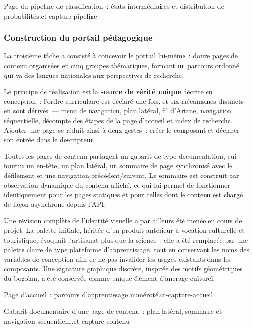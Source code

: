 {Page du pipeline de classification~: états intermédiaires et distribution de
	probabilités.}{ct-capture-pipeline}

\subsubsection{Construction du portail pédagogique}
\label{ssec:ct-portail}

La troisième tâche a consisté à concevoir le portail lui-même~: douze pages de contenu
organisées en cinq groupes thématiques, formant un parcours ordonné qui va des langues
nationales aux perspectives de recherche.

Le principe de réalisation est la \textbf{source de vérité unique} décrite en
conception~: l'ordre curriculaire est déclaré une fois, et six mécanismes distincts en
sont dérivés~--- menu de navigation, plan latéral, fil d'Ariane, navigation
séquentielle, décompte des étapes de la page d'accueil et index de recherche. Ajouter
une page se réduit ainsi à deux gestes~: créer le composant et déclarer son entrée dans
le descripteur.

Toutes les pages de contenu partagent un gabarit de type documentation, qui fournit un
en-tête, un plan latéral, un sommaire de page synchronisé avec le défilement et une
navigation \og{}précédent/suivant\fg{}. Le sommaire est construit par observation
dynamique du contenu affiché, ce qui lui permet de fonctionner identiquement pour les
pages statiques et pour celles dont le contenu est chargé de façon asynchrone depuis
l'API.

Une révision complète de l'identité visuelle a par ailleurs été menée en cours de
projet. La palette initiale, héritée d'un produit antérieur à vocation
culturelle et touristique, évoquait l'artisanat plus que la science~; elle a été
remplacée par une palette claire de type plateforme d'apprentissage, tout en
conservant les noms des variables de conception afin de ne pas invalider les usages
existants dans les composants. Une signature graphique discrète, inspirée des motifs
géométriques du bogolan, a été conservée comme unique élément d'ancrage culturel.

{Page d'accueil~: parcours d'apprentissage numéroté.}{ct-capture-accueil}

{Gabarit documentaire d'une page de contenu~: plan latéral, sommaire et navigation
	séquentielle.}{ct-capture-contenu}

